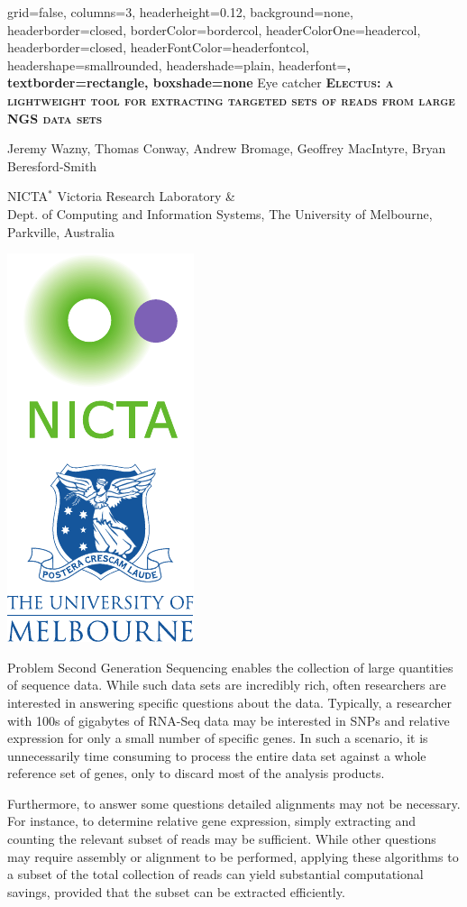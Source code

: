 \documentclass[a0paper,portrait]{baposter}
\begin{document}
\begin{poster}{
    grid=false,
    columns=3,
    headerheight=0.12\textheight,
    background=none,
    headerborder=closed,
    borderColor=bordercol,
    headerColorOne=headercol,
    headerborder=closed,
    headerFontColor=headerfontcol,
    headershape=smallrounded,
    headershade=plain,
    headerfont=\bf\Large\textsc,
    textborder=rectangle,
    boxshade=none
}
{
    Eye catcher
}
{
\bf\textsc{Electus: a lightweight tool for extracting targeted sets of reads from large NGS data sets}\vspace{0.2em}
}
{
\textsc\large{Jeremy Wazny, Thomas Conway, Andrew Bromage, Geoffrey MacIntyre, Bryan Beresford-Smith}

\textsc\large{NICTA$^{*}$ Victoria Research Laboratory \& \\ Dept. of Computing and Information Systems, The University of Melbourne, Parkville, Australia}
}
{
\includegraphics[width=0.075\linewidth]{logos_vert}
}

\begin{posterbox}[name=problem,column=0,row=0]{Problem}
Second Generation Sequencing enables the collection of large quantities of sequence data.
While such data sets are incredibly rich, often researchers are interested in answering specific questions about the data.
Typically, a researcher with 100s of gigabytes of RNA-Seq data may be interested in SNPs and relative expression for only a small number of specific genes.
In such a scenario, it is unnecessarily time consuming to process the entire data set against a whole reference set of genes, only to discard most of the analysis products.

Furthermore, to answer some questions detailed alignments may not be necessary. For instance, to determine relative gene expression, simply extracting and counting the relevant subset of reads may be sufficient.
While other questions may require assembly or alignment to be performed, applying these algorithms to a subset of the total collection of reads can yield substantial computational savings, provided that the subset can be extracted efficiently.
\end{posterbox}


\end{poster}
\end{document}
